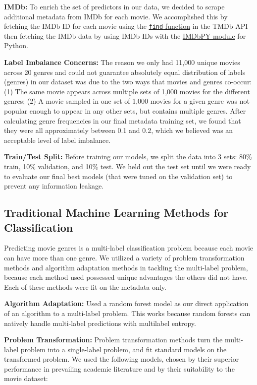 \documentclass{article}
\begin{document}
        \textbf{IMDb:}
        To enrich the set of predictors in our data, we decided to scrape additional metadata from IMDb for each movie. We accomplished this by fetching the IMDb ID for each movie using the \href{https://developers.themoviedb.org/3/find}{\texttt{find} function} in the TMDb API then fetching the IMDb data by using IMDb IDs with the \href{http://imdbpy.sourceforge.net/}{IMDbPY module} for Python.
        
        \textbf{Label Imbalance Concerns:}
        The reason we only had 11,000 unique movies across 20 genres and could not guarantee absolutely equal distribution of labels (genres) in our dataset was due to the two ways that movies and genres co-occur: (1) The same movie appears across multiple sets of 1,000 movies for the different genres; (2) A movie sampled in one set of 1,000 movies for a given genre was not popular enough to appear in any other sets, but contains multiple genres. After calculating genre frequencies in our final metadata training set, we found that they were all approximately between 0.1 and 0.2, which we believed was an acceptable level of label imbalance.
        
        \textbf{Train/Test Split:}
        Before training our models, we split the data into 3 sets: 80\% train, 10\% validation, and 10\% test. We held out the test set until we were ready to evaluate our final best models (that were tuned on the validation set) to prevent any information leakage.
        
    \subsection{Traditional Machine Learning Methods for Classification}
        \indent 
        
        Predicting movie genres is a multi-label classification problem because each movie can have more than one genre. We utilized a variety of problem transformation methods and algorithm adaptation methods in tackling the multi-label problem, because each method used possessed unique advantages the others did not have. Each of these methods were fit on the metadata only. 
        
        \textbf{Algorithm Adaptation:}
        Used a random forest model as our direct application of an algorithm to a multi-label problem. This works because random forests can natively handle multi-label predictions with multilabel entropy.
        
        \textbf{Problem Transformation:}
        Problem transformation methods turn the multi-label problem into a single-label problem, and fit standard models on the transformed problem. We used the following models, chosen by their superior performance in prevailing academic literature and by their suitability to the movie dataset:
        
\end{document}
